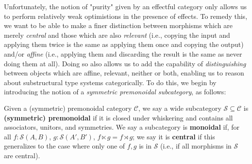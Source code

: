 \documentclass[acmsmall,screen,review]{acmart}
\newcommand{\mc}[1]{\ensuremath{\mathcal{#1}}}
\begin{document}
Unfortunately, the notion of "purity" given by an effectful category only allows
us to perform relatively weak optimistions in the presence of effects. To remedy
this, we want to be able to make a finer distinction between morphisms which are
merely \textit{central} and those which are also \textit{relevant} (i.e.,
copying the input and applying them twice is the same as applying them once and
copying the output) and/or \textit{affine} (i.e., applying them and discarding
the result is the same as never doing them at all). Doing so also allows us to
add the capability of \textit{distinguishing} between objects which are affine,
relevant, neither or both, enabling us to reason about substructural type
systems categorically. To do this, we begin by introducing the notion of a \textit{symmetric
premonoidal subcategory}, as follows:
\begin{definition}
  Given a (symmetric) premonoidal category \(\mc{C}\), we say a wide subcategory
  \(\mc{S} \subseteq \mc{C}\) is \textbf{(symmetric) premonoidal} if it is
  closed under whiskering and contains all associators, unitors, and symmetries.
  We say a subcategory is \textbf{monoidal} if, for all \(f: \mc{S}(A, B)\),
  \(g: \mc{S}(A', B')\), \(f \ltimes g = f \rtimes g\); we say it is
  \textbf{central} if this generalizes to the case where only one of \(f, g\) is
  in \(\mc{S}\) (i.e., if all morphisms in \(\mc{S}\) are central).
\end{definition} 
\end{document}
